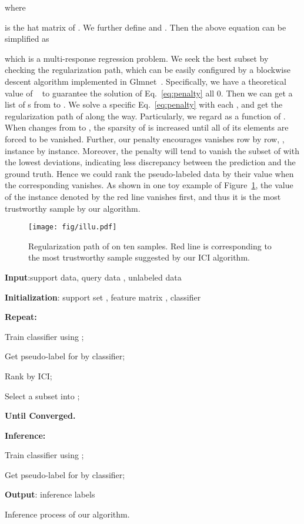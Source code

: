 \documentclass[10pt,letterpaper,twocolumn]{article}
\begin{document}
where 

is the hat matrix of
.
We further define  and .
Then the above equation can be simplified as

which is a multi-response regression problem. 
We seek the best subset by checking the regularization path, 
which can be easily configured by 
a blockwise descent algorithm
implemented in Glmnet~\cite{simon2013blockwise}. 
Specifically,
we have a theoretical value of ~\cite{simon2013blockwise} to guarantee the solution of Eq.~\ref{eq:penalty} all 0.
Then we can get a list of s from  to . 
We solve a specific Eq.~\ref{eq:penalty} with each ,
and get the regularization path of  along the way.
Particularly, we regard  as a function of . 
When  changes from  to , the sparsity of  is increased until all of its elements are forced to be vanished. 
Further, our penalty  encourages  vanishes row by row, \ie, instance by instance. 
Moreover, the penalty will tend to vanish the subset of  with the lowest deviations, indicating less discrepancy between the prediction and the ground truth.
Hence we could rank the pseudo-labeled data by their  value when the corresponding  vanishes. 
As shown in one toy example of Figure~\ref{fig:illu}, the  value of the instance denoted by the red line vanishes first, and thus it is the most trustworthy sample by our algorithm. 
\begin{figure}
\begin{centering}
\texttt{[image: fig/illu.pdf]}
\par\end{centering}
\caption{\label{fig:illu}
Regularization path of  on ten samples. Red line is corresponding to the most trustworthy sample suggested by our ICI algorithm.}
\end{figure}
\begin{algorithm}
\textbf{Input}:support data, query data , unlabeled data 

\textbf{Initialization}: support set , feature matrix , classifier

\textbf{Repeat:}

Train classifier using ;

Get pseudo-label  for  by classifier;

Rank  by ICI;

Select a subset  into ;

\textbf{Until Converged.}

\textbf{Inference:}

Train classifier using ;

Get pseudo-label  for  by classifier;

\textbf{Output}: inference labels 

\caption{\label{alg:Inference-process.}Inference process of our algorithm.}
\end{algorithm}
\end{document}
